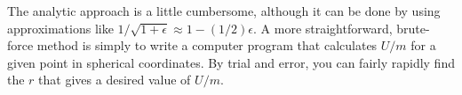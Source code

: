 The analytic approach is a little cumbersome,
although it can be done  by using approximations like
$1/\sqrt{1+\epsilon}\approx1-(1/2)\epsilon$. A more straightforward, brute-force
method is simply to write a computer program that calculates $U/m$ for
a given point in spherical coordinates. By trial and error, you can fairly rapidly
find the $r$ that gives a desired value of $U/m$.




